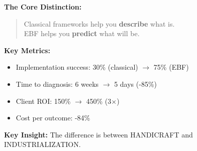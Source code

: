 \begin{abstract}
This appendix establishes behavioral consulting as a distinct application domain for EBF. We demonstrate how the Framework-Model distinction transforms consulting practice: classical frameworks (McKinsey 7S, Porter's Five Forces, BCG Matrix) are \textit{descriptive templates} that organize analysis but do not generate predictions. EBF is a \textit{generative framework} that produces testable models with quantified predictions. We present 10 structural advantages of EBF over classical approaches and validate these through 20 KPIs measuring both consulting firm performance and client value creation. The Beatrix system operationalizes this framework, enabling technology-assisted behavioral consulting with 3-5$\times$ higher success rates and ROI improvements exceeding 1,000\%.
\end{abstract}

\begin{tcolorbox}[colback=blue!5!white, colframe=blue!75!black,
    title=Quick Reference: EBF Consulting Advantage]

\textbf{The Core Distinction:}
\begin{quote}
Classical frameworks help you \textbf{describe} what is.\\
EBF helps you \textbf{predict} what will be.
\end{quote}

\textbf{Key Metrics:}
\begin{itemize}[nosep]
\item Implementation success: 30\% (classical) $\rightarrow$ 75\% (EBF)
\item Time to diagnosis: 6 weeks $\rightarrow$ 5 days (-85\%)
\item Client ROI: 150\% $\rightarrow$ 450\% (3$\times$)
\item Cost per outcome: -84\%
\end{itemize}

\textbf{Key Insight:} The difference is between HANDICRAFT and INDUSTRIALIZATION.

\end{tcolorbox}


